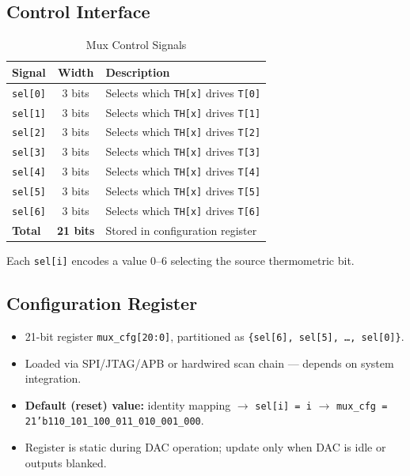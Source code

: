\documentclass[11pt,a4paper]{article}
\begin{document}
\subsection{Control Interface}

\begin{table}[h]
\centering
\begin{tabular}{@{}lcp{7cm}@{}}
\toprule
\textbf{Signal} & \textbf{Width} & \textbf{Description} \\
\midrule
\texttt{sel[0]} & 3 bits & Selects which \texttt{TH[x]} drives \texttt{T[0]} \\
\texttt{sel[1]} & 3 bits & Selects which \texttt{TH[x]} drives \texttt{T[1]} \\
\texttt{sel[2]} & 3 bits & Selects which \texttt{TH[x]} drives \texttt{T[2]} \\
\texttt{sel[3]} & 3 bits & Selects which \texttt{TH[x]} drives \texttt{T[3]} \\
\texttt{sel[4]} & 3 bits & Selects which \texttt{TH[x]} drives \texttt{T[4]} \\
\texttt{sel[5]} & 3 bits & Selects which \texttt{TH[x]} drives \texttt{T[5]} \\
\texttt{sel[6]} & 3 bits & Selects which \texttt{TH[x]} drives \texttt{T[6]} \\
\midrule
\textbf{Total}  & \textbf{21 bits} & Stored in configuration register \\
\bottomrule
\end{tabular}
\caption{Mux Control Signals}
\end{table}

Each \texttt{sel[i]} encodes a value 0--6 selecting the source thermometric bit.

\subsection{Configuration Register}

\begin{itemize}
    \item 21-bit register \texttt{mux\_cfg[20:0]}, partitioned as \texttt{\{sel[6], sel[5], \ldots, sel[0]\}}.
    \item Loaded via SPI/JTAG/APB or hardwired scan chain --- depends on system integration.
    \item \textbf{Default (reset) value:} identity mapping $\rightarrow$ \texttt{sel[i] = i} $\rightarrow$ \texttt{mux\_cfg = 21'b110\_101\_100\_011\_010\_001\_000}.
    \item Register is static during DAC operation; update only when DAC is idle or outputs blanked.
\end{itemize}
\end{document}
